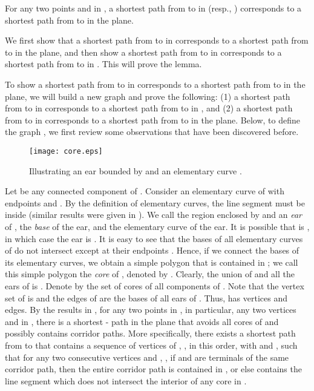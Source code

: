 \documentclass[english,runningheads,11pt]{llncs}
\newenvironment{proof}{\noindent {\textbf{Proof:}}\rm}{\hfill \rm}
\begin{document}
\begin{lemma}\label{lem:40}
For any two points  and  in ,
a shortest path from  to  in  (resp., )
corresponds to a shortest path from  to  in the plane.
\end{lemma}
\begin{proof}
We first show that a shortest path from  to  in
 corresponds to a shortest
path from  to  in the plane, and then show a shortest path from  to  in
 corresponds to a shortest path from  to  in
. This will prove the lemma.


To show a shortest path from  to  in
 corresponds to a shortest
path from  to  in the plane, we will build a new graph  and
prove the following: (1) a shortest path from  to  in 
corresponds to a shortest path from  to  in ,
and (2) a shortest path from  to  in  corresponds to a
shortest path from  to  in the plane. Below, to define the
graph , we first review some observations that have been discovered
before.


\begin{figure}[t]
\begin{minipage}[t]{\linewidth}
\begin{center}
\texttt{[image: core.eps]}
\caption{\footnotesize Illustrating an ear bounded by  and an elementary curve .}
\label{fig:core}
\end{center}
\end{minipage}
\vspace*{-0.15in}
\end{figure}

Let  be any connected component of . Consider an elementary curve  of
 with endpoints  and . By
the definition of elementary curves, the line segment 
must be inside  (similar results were given in
\cite{ref:ChenA11ESA,ref:ChenCo12arXiv,ref:ChenL113STACS}). We call
the region enclosed by  and  an {\em ear} of ,
 the {\em base} of the ear, and  the elementary curve of the ear.
It is possible that  is , in which case
the ear is . It is easy to see that the bases of all
elementary curves of  do not intersect except at their endpoints
\cite{ref:ChenA11ESA,ref:ChenCo12arXiv,ref:ChenL113STACS}. Hence, if
we connect the bases of its elementary curves, we obtain a simple
polygon that is contained in ; we call this simple polygon the
{\em core} of , denoted by . Clearly, the union of
 and all the ears of  is . Denote by  the set of
cores of all components of . Note
that the vertex set of  is  and the edges of
 are the bases of all ears of .
Thus,  has  vertices and edges.
By the results in
\cite{ref:ChenA11ESA,ref:ChenCo12arXiv,ref:ChenL113STACS}, for any
two points in , in particular, any two vertices  and  in ,
there is a shortest - path in the plane that avoids all
cores of  and possibly contains corridor paths. More
specifically, there exists a shortest path  from  to 
that contains a sequence of vertices of ,
, in this order, with  and , such that for
any two consecutive vertices  and , , if
 and  are terminals of the same corridor path, then the
entire corridor path is contained in , or else 
contains the line segment  which does not
intersect the interior of any core in .





\end{proof}
\end{document}
